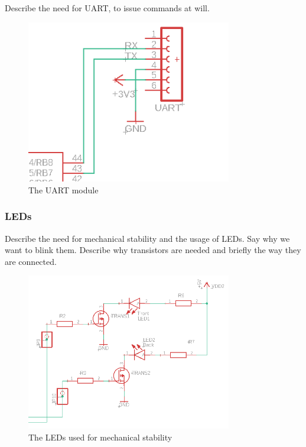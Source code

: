 Describe the need for UART, to issue commands at will.

\begin{figure}[htb]
    \centering
    \includegraphics[width=0.8\textwidth]{figures/hardware/UART.PNG}
    \caption{The UART module}
    \label{fig:uart}
\end{figure}

\FloatBarrier


\subsubsection{LEDs}

Describe the need for mechanical stability and the usage of LEDs. Say why we want to blink them.
Describe why transistors are needed and briefly the way they are connected.

\begin{figure}[htb]
    \centering
    \includegraphics[width=0.8\textwidth]{figures/hardware/LEDs.PNG}
    \caption{The LEDs used for mechanical stability}
    \label{fig:leds}
\end{figure}

